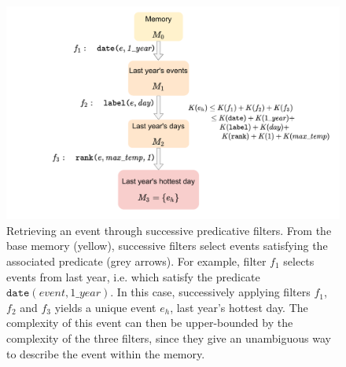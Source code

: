 \documentclass[conference]{IEEEtran}
\begin{document}

\begin{figure}[ht]
  \centering
\includegraphics[width=\linewidth]{figures/filters}
\caption{Retrieving an event through successive predicative
filters. From the base memory (yellow), successive filters select events satisfying the associated predicate (grey arrows). For example,
filter $f_1$ selects events from last year, i.e. which satisfy the
predicate $\mathtt{date}(event, 1\_year)$. In this case, successively
applying filters $f_1$, $f_2$ and $f_3$ yields a unique event $e_h$, last
year's hottest day. The complexity of this event can then be upper-bounded
by the complexity of the three filters, since they give an unambiguous way
to describe the event within the memory.}
  \label{fig:filters}
\end{figure}
\end{document}
